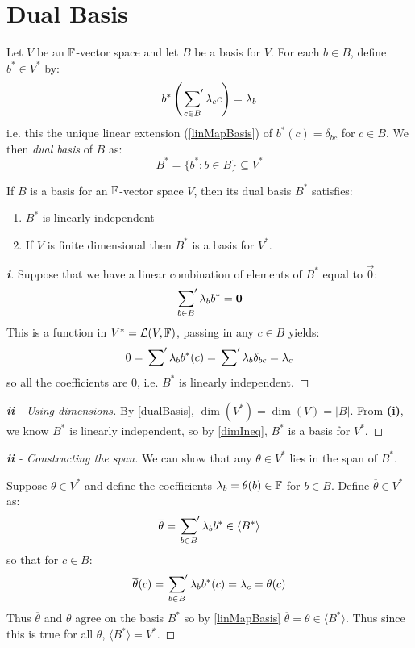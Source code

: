\documentclass[../main.tex]{subfiles}
\begin{document}
\section{Dual Basis}
\begin{definition}
  Let $V$ be an $\mathbb{F}$-vector space and let $B$ be a basis for $V$.
  For each $b \in B$, define $b^{*} \in V^{*}$ by:
  \[
    b^{*}\left(\sideset{}{'}\sum_{c \in B} \lambda_c c\right) = \lambda_b
  \]
  i.e. this the unique linear extension (\cref{linMapBasis}) of $b^{*}(c) = \delta_{b c}$ for $c \in B$.
  We then \textit{dual basis} of $B$ as:
  \[
    B^{*} = \{b^{*}: b \in B\} \subseteq V^{*}
  \]
\end{definition}
\begin{proposition}
  If $B$ is a basis for an $\mathbb{F}$-vector space $V$, then its dual basis $B^{*}$ satisfies: \label{dualBasis}
  \begin{enumerate}
    \item $B^{*}$ is linearly independent
    \item If $V$ is finite dimensional then $B^{*}$ is a basis for $V^{*}$.
  \end{enumerate}
\end{proposition}
\begin{proof}[\textbf{i}]
  Suppose that we have a linear combination of elements of $B^{*}$ equal to $\vec{0}$:
  \[
    \sideset{}{'}\sum_{b \in B} \lambda_b b^{*} = \mathbf{\bm{0}}
  \]
  This is a function in $V^{*} = \mathcal{L}(V, \mathbb{F})$, passing in any $c \in B$ yields:
  \[
    0 = \sideset{}{'}\sum \lambda_b b^{*}(c) = \sideset{}{'}\sum \lambda_b \delta_{b c} = \lambda_c
  \]
  so all the coefficients are 0, i.e. $B^{*}$ is linearly independent.
\end{proof}
\begin{proof}[\textbf{ii} - Using dimensions]
  By \cref{dualBasis}, $\dim(V^{*}) = \dim(V) = |B|$.
  From \textbf{(i)}, we know $B^{*}$ is linearly independent, so by \cref{dimIneq}, $B^{*}$ is a basis for $V^{*}$.
\end{proof}
\begin{proof}[\textbf{ii} - Constructing the span]
  We can show that any $\theta \in V^{*}$ lies in the span of $B^{*}$.

  Suppose $\theta \in V^{*}$ and define the coefficients $\lambda_b = \theta(b) \in \mathbb{F}$ for $b \in B$.
  Define $\overline{\theta} \in V^{*}$ as:
  \[
    \overline{\theta} = \sideset{}{'}\sum_{b \in B} \lambda_b b^{*} \in \langle B^{*} \rangle
  \]
  so that for $c \in B$:
  \[
    \overline{\theta}(c) = \sideset{}{'}\sum_{b \in B} \lambda_b b^{*}(c) = \lambda_c = \theta(c)
  \]
  Thus $\overline{\theta}$ and $\theta$ agree on the basis $B^{*}$ so by \cref{linMapBasis} $\overline{\theta} = \theta \in \langle B^{*} \rangle$.
  Thus since this is true for all $\theta$, $\langle B^{*} \rangle = V^{*}$.
\end{proof}
\end{document}
